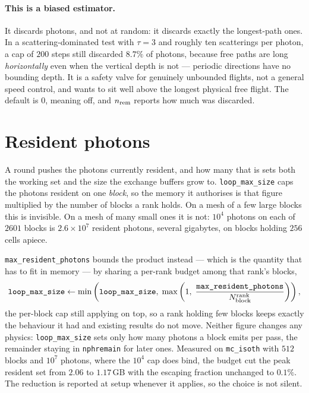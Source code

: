 \documentclass[11pt]{article}
\begin{document}
\paragraph{This is a biased estimator.} It discards photons, and not at random: it discards
exactly the longest-path ones. In a scattering-dominated test with $\tau = 3$ and roughly
ten scatterings per photon, a cap of $200$ steps still discarded $8.7\%$ of photons,
because free paths are long \emph{horizontally} even when the vertical depth is not ---
periodic directions have no bounding depth. It is a safety valve for genuinely unbounded
flights, not a general speed control, and wants to sit well above the longest physical free
flight. The default is $0$, meaning off, and $n_{\rm rem}$ reports how much was discarded.

\section{Resident photons}
\label{sec:resident}

A round pushes the photons currently resident, and how many that is sets both the working
set and the size the exchange buffers grow to. \texttt{loop\_max\_size} caps the photons
resident on one \emph{block}, so the memory it authorises is that figure multiplied by the
number of blocks a rank holds. On a mesh of a few large blocks this is invisible. On a mesh
of many small ones it is not: $10^{4}$ photons on each of $2601$ blocks is
$2.6\times10^{7}$ resident photons, several gigabytes, on blocks holding $256$ cells
apiece.

\texttt{max\_resident\_photons} bounds the product instead --- which is the quantity that
has to fit in memory --- by sharing a per-rank budget among that rank's blocks,
\begin{equation}
  \texttt{loop\_max\_size} \leftarrow
    \min\left(\texttt{loop\_max\_size},\;
      \max\left(1,\;
        \frac{\texttt{max\_resident\_photons}}{N^{\rm rank}_{\rm block}}\right)\right),
  \label{eq:budget}
\end{equation}
the per-block cap still applying on top, so a rank holding few blocks keeps exactly the
behaviour it had and existing results do not move. Neither figure changes any physics:
\texttt{loop\_max\_size} sets only how many photons a block emits per pass, the remainder
staying in \texttt{nphremain} for later ones. Measured on \texttt{mc\_isoth} with $512$
blocks and $10^{7}$ photons, where the $10^{4}$ cap does bind, the budget cut the peak
resident set from $2.06$ to $1.17$\,GB with the escaping fraction unchanged to $0.1\%$. The
reduction is reported at setup whenever it applies, so the choice is not silent.
\end{document}
